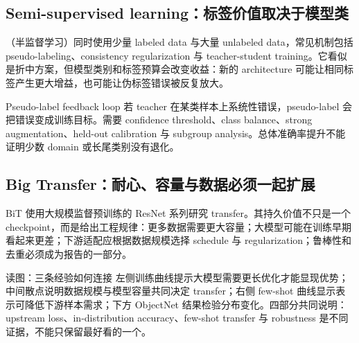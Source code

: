 
\subsection{Semi-supervised learning：标签价值取决于模型类}

（半监督学习）同时使用少量 labeled data 与大量 unlabeled data，常见机制包括 pseudo-labeling、consistency regularization 与 teacher-student training。它看似是折中方案，但模型类别和标签预算会改变收益：新的 architecture 可能让相同标签产生更大增益，也可能让伪标签错误被反复放大。


\begin{warningbox}{Pseudo-label feedback loop}
若 teacher 在某类样本上系统性错误，pseudo-label 会把错误变成训练目标。需要 confidence threshold、class balance、strong augmentation、held-out calibration 与 subgroup analysis。总体准确率提升不能证明少数 domain 或长尾类别没有退化。
\end{warningbox}

\subsection{Big Transfer：耐心、容量与数据必须一起扩展}

BiT 使用大规模监督预训练的 ResNet 系列研究 transfer。其持久价值不只是一个 checkpoint，而是给出工程规律：更多数据需要更大容量；大模型可能在训练早期看起来更差；下游适配应根据数据规模选择 schedule 与 regularization；鲁棒性和去重必须成为报告的一部分。


\begin{knowledgebox}{读图：三条经验如何连接}
左侧训练曲线提示大模型需要更长优化才能显现优势；中间散点说明数据规模与模型容量共同决定 transfer；右侧 few-shot 曲线显示表示可降低下游样本需求；下方 ObjectNet 结果检验分布变化。四部分共同说明：upstream loss、in-distribution accuracy、few-shot transfer 与 robustness 是不同证据，不能只保留最好看的一个。
\end{knowledgebox}


